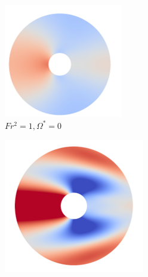 \begin{figure}
    \begin{subfigure}[b]{0.25\textwidth}
        \centering
        \includegraphics[width=\textwidth]{images/circle/ps0fs1.png}
        \caption{$Fr^2 = 1, \Omega^{\ast} = 0$}
        \label{fig:ps0fs1}
    \end{subfigure}
    \hfill
    \begin{subfigure}[b]{0.25\textwidth}
        \centering
        \includegraphics[width=\textwidth]{images/circle/ps0fs0p1.png}

\end{subfigure}
\end{figure}
